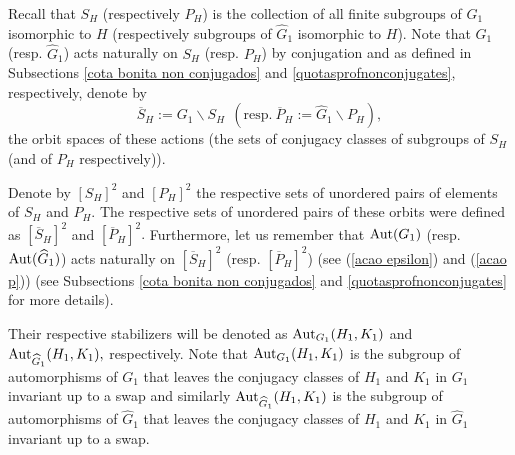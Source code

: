 \documentclass[a4paper,12pt]{article}
\def\aut {{\rm Aut}}
\def\inn {{\rm Inn}}
\begin{document}
{Recall that $S_H$ (respectively $P_H$) is the collection of all finite subgroups of $G_1$ isomorphic to $H$ (respectively subgroups of $\widehat{G}_1$ isomorphic to $H$).  Note that $G_1$ (resp. $\widehat{G}_1$) acts naturally on $S_H$ (resp. $P_H$) by conjugation and as defined in Subsections \ref{cota bonita non conjugados} and \ref{quotasprofnonconjugates}, respectively, denote by 
$$\overline{S}_H:=G_1 \backslash S_H\ \  (\textrm{resp.}\  \overline{P}_H:= \widehat{G}_1 \backslash P_H),$$ the orbit spaces of these actions (the sets of conjugacy classes of subgroups of $S_H$ (and of $P_H$ respectively)). %

Denote by $[S_H]^2$ and $[P_H]^2$ the respective sets of unordered pairs of elements of $S_H$ and $P_H.$
The respective sets of unordered pairs of these orbits were defined as $[\overline{S}_H]^2$ and $[\overline{P}_H]^2.$ Furthermore, let us remember that $\aut(G_1)$ (resp. $\aut(\widehat{G}_1)$) acts naturally on $[\overline{S}_H]^2$ (resp. $[\overline{P}_H]^2$) (see (\ref{acao epsilon}) and (\ref{acao p})) (see Subsections \ref{cota bonita non conjugados} and \ref{quotasprofnonconjugates} for more details). 

 Their respective stabilizers will be denoted as $\aut_{G_1}(H_1, K_1)$ and $\aut_{\widehat G_1}(H_1,\\ K_1),$ respectively. Note that $\aut_{G_1}(H_1, K_1)$ is the subgroup of automorphisms of $G_1$ that leaves the conjugacy classes of $H_1$ and $K_1$ in $G_1$ invariant 
 up to a swap %
 and similarly $\aut_{\widehat G_1}(H_1, K_1)$ is the subgroup of automorphisms of $\widehat G_1$ that leaves the conjugacy classes of $H_1$ and $K_1$ in $\widehat G_1$ invariant 
 up to a swap.








}
\end{document}
